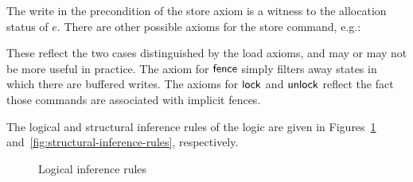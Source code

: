 \documentclass[11pt]{article}
\begin{document}
The write in the precondition of the store axiom is a witness to the allocation status of $e$. There are other possible axioms for the store command, e.g.: 

These reflect the two cases distinguished by the load axioms, and may or may not be more useful in practice. The axiom for $\operatorname{\mathsf{fence}}$ simply filters away states in which there are buffered writes. The axioms for $\operatorname{\mathsf{lock}}$ and $\operatorname{\mathsf{unlock}}$ reflect the fact those commands are associated with implicit fences.

The logical and structural inference rules of the logic are given in Figures~\ref{fig:logical-inference-rules} and~\ref{fig:structural-inference-rules}, respectively.

\begin{figure}[ht]
	\centering
	\caption{\label{fig:logical-inference-rules}Logical inference rules}
\end{figure}
\end{document}
